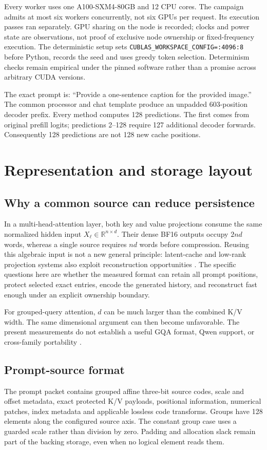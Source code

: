 \documentclass{article}
\begin{document}
Every worker uses one A100-SXM4-80GB and 12 CPU cores. The campaign admits
at most six workers concurrently, not six GPUs per request. Its execution
passes ran separately. GPU sharing on the node is recorded; clocks and
power state are observations, not proof of exclusive node ownership or
fixed-frequency execution. The deterministic setup sets
\texttt{CUBLAS\_WORKSPACE\_CONFIG=:4096:8} before Python, records the seed and
uses greedy token selection. Determinism checks remain empirical under
the pinned software rather than a promise across arbitrary CUDA versions.

The exact prompt is: ``Provide a one-sentence caption for the provided
image.'' The common processor and chat template produce an unpadded
603-position decoder prefix. Every method computes 128 predictions. The
first comes from original prefill logits; predictions 2--128 require 127
additional decoder forwards. Consequently 128 predictions are not 128
new cache positions.

\section{Representation and storage layout}
\subsection{Why a common source can reduce persistence}
In a multi-head-attention layer, both key and value projections consume
the same normalized hidden input $X_\ell\in\mathbb R^{n\times d}$.
Their dense BF16 outputs occupy $2nd$ words, whereas a single source
requires $nd$ words before compression. Reusing this algebraic input is
not a new general principle: latent-cache and low-rank projection systems
also exploit reconstruction opportunities \citep{chang2024palu}. The
specific questions here are whether the measured format can retain all
prompt positions, protect selected exact entries, encode the generated
history, and reconstruct fast enough under an explicit ownership boundary.

For grouped-query attention, $d$ can be much larger than the combined K/V
width. The same dimensional argument can then become unfavorable. The
present measurements do not establish a useful GQA format, Qwen support,
or cross-family portability \citep{ainslie2023gqa}.

\subsection{Prompt-source format}
The prompt packet contains grouped affine three-bit source codes, scale
and offset metadata, exact protected K/V payloads, positional information,
numerical patches, index metadata and applicable lossless code transforms.
Groups have 128 elements along the configured source axis. The constant
group case uses a guarded scale rather than division by zero. Padding and
allocation slack remain part of the backing storage, even when no logical
element reads them.
\end{document}
